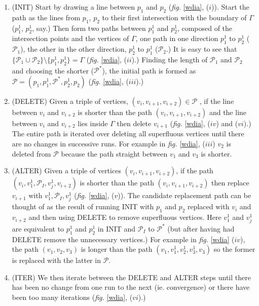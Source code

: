 \documentclass[a4paper,10pt]{article}
\newcommand{\fig}[1]{\emph{fig.} \ref{#1}}
\begin{document}
\begin{enumerate}
\item (INIT) Start by drawing a line between $p_1$ and $p_2$ (\fig{wdia}, ($i$)). Start the path as the lines from $p_1$, $p_2$ to their first intersection with the boundary of $\Gamma$ ($p_1^1$, $p_2^1$, say.) Then form two paths between $p_1^1$ and $p_2^1$, composed of the intersection points and the vertices of $\Gamma$, one path in one direction $p_1^1$ to $p_2^1$ ($\mathcal{P}_1$), the other in the other direction, $p_2^1$ to $p_1^1$ ($\mathcal{P}_2$.) It is easy to see that $\{\mathcal{P}_1 \cup \mathcal{P}_2\} \setminus \{p_1^1, p_2^1\} = \Gamma$ (\fig{wdia}, ($ii$).) Finding the length of $\mathcal{P}_1$ and $\mathcal{P}_2$ and choosing the shorter ($\mathcal{P^*}$), the initial path is formed as $\mathcal{P}=(p_1,p_1^1,\mathcal{P}^*,p_2^1,p_2)$ (\fig{wdia}, ($iii$).) 

\item (DELETE) Given a triple of vertices, $(v_i, v_{i+1}, v_{i+2}) \in \mathcal{P}$ , if the line between $v_i$ and $v_{i+2}$ is shorter than the path $(v_i, v_{i+1}, v_{i+2})$ and the line between $v_i$ and $v_{i+2}$ lies inside $\Gamma$ then delete $v_{i+1}$ (\fig{wdia}, ($iv$) and ($vi$).) The entire path is iterated over deleting all superfluous vertices until there are no changes in successive runs. For example in \fig{wdia}, ($iii$) $v_2$ is deleted from $\mathcal{P}$ because the path straight between $v_1$ and $v_3$ is shorter. 

\item (ALTER) Given a triple of vertices $(v_i, v_{i+1}, v_{i+2})$, if the path $(v_i, v^1_1, \mathcal{P}_I, v^1_j, v_{i+2})$ is shorter than the path $(v_i, v_{i+1}, v_{i+2})$ then replace $v_{i+1}$ with $v^1_1, \mathcal{P}_I, v^1_j$ (\fig{wdia}, ($v$)). The candidate replacement path can be thought of as the result of running INIT with $p_1$ and $p_2$ replaced with $v_i$ and $v_{i+2}$ and then using DELETE to remove superfluous vertices. Here $v^1_1$ and $v^1_j$ are equivalent to $p_1^1$ and $p_2^1$ in INIT and $\mathcal{P}_I$ to $\mathcal{P}^*$ (but after having had DELETE remove the unnecessary vertices.) For example in \fig{wdia} ($iv$), the path $(v_1, v_2, v_3)$ is longer than the path $(v_1, v^1_1, v^1_2, v^1_3, v_3)$ so the former is replaced with the latter in $\mathcal{P}$.

\item (ITER) We then iterate between the DELETE and ALTER steps until there has been no change from one run to the next (ie. convergence) or there have been too many iterations (\fig{wdia}, ($vi$).)
\end{enumerate}
\end{document}
